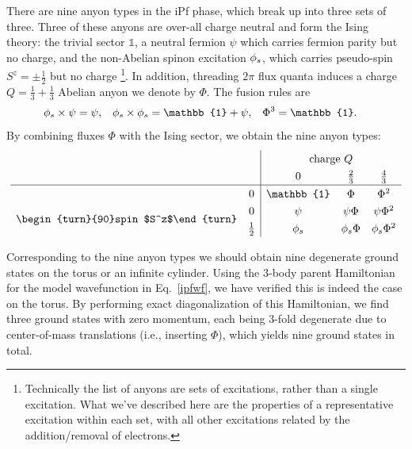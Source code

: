 There are nine anyon types in the iPf phase, which break up into three sets of three.
Three of these anyons are over-all charge neutral and form the Ising theory: the trivial sector $\mathbb{1}$, a neutral fermion $\psi$ which carries fermion parity but no charge, and the non-Abelian spinon excitation ${\phi_s}$, which  carries pseudo-spin $S^z = \pm\frac12$ but no charge
	\footnote{Technically the list of anyons are sets of excitations, rather than a single excitation.  What we've described here are the properties of a representative excitation within each set, with all other excitations related by the addition/removal of electrons.}.
In addition, threading $2 \pi$ flux quanta induces a charge $Q = \frac{1}{3} +  \frac{1}{3}$ Abelian anyon we denote by $\Phi$.
The fusion rules are
\begin{align}
	\spinon \times \psi &= \psi, & \spinon \times \spinon &= \mathbb{1} + \psi, & \Phi^3 &= \mathbb{1}.
\end{align}
By combining fluxes $\Phi$ with the Ising sector, we obtain the nine anyon types:
\begin{align}
	\renewcommand{\arraystretch}{1.3}
	\begin{array}{cc|ccc}
		&&	\multicolumn{3}{c}{\textrm{charge }Q}
	\\	&&	0	&	\frac23	&	\frac43
	\\\hline
		\multirow{4}{*}{\begin{turn}{90}spin $S^z$\end{turn}}&0&	\mathbb{1}	&	\Phi	&	\Phi^2
	\\	&0&	\psi	&	\psi\Phi	&	\psi\Phi^2
	\\	&\frac12&	\spinon	&	\spinon\Phi	&	\spinon\Phi^2
	\end{array}
\end{align}

Corresponding to the nine anyon types we should obtain nine degenerate ground states on the torus or an infinite cylinder.
Using the 3-body parent Hamiltonian~\cite{lankvelt, CHLee15} for the model wavefunction in Eq.~\eqref{ipfwf}, we have verified this is indeed the case on the torus.
By performing exact diagonalization of this Hamiltonian, we find three ground states with zero momentum, each being 3-fold degenerate due to center-of-mass translations (i.e., inserting $\Phi$), which yields nine ground states in total.

